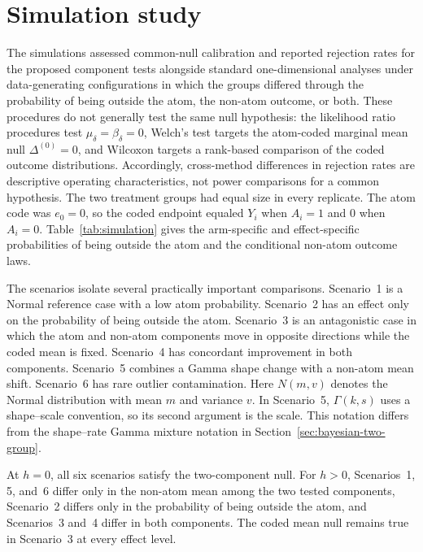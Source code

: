\documentclass[11pt]{article}
\begin{document}




\section{Simulation study}\label{sec:simulation-study}

The simulations assessed common-null calibration and reported rejection rates for the proposed component tests alongside standard one-dimensional analyses under data-generating configurations in which the groups differed through the probability of being outside the atom, the non-atom outcome, or both. These procedures do not generally test the same null hypothesis: the likelihood ratio procedures test $\mu_\delta=\beta_\delta=0$, Welch's test targets the atom-coded marginal mean null $\Delta^{(0)}=0$, and Wilcoxon targets a rank-based comparison of the coded outcome distributions. Accordingly, cross-method differences in rejection rates are descriptive operating characteristics, not power comparisons for a common hypothesis. The two treatment groups had equal size in every replicate. The atom code was $e_0=0$, so the coded endpoint equaled $Y_i$ when $A_i=1$ and 0 when $A_i=0$. Table~\ref{tab:simulation} gives the arm-specific and effect-specific probabilities of being outside the atom and the conditional non-atom outcome laws.

The scenarios isolate several practically important comparisons. Scenario~1 is a Normal reference case with a low atom probability. Scenario~2 has an effect only on the probability of being outside the atom. Scenario~3 is an antagonistic case in which the atom and non-atom components move in opposite directions while the coded mean is fixed. Scenario~4 has concordant improvement in both components. Scenario~5 combines a Gamma shape change with a non-atom mean shift. Scenario~6 has rare outlier contamination. Here $N(m,v)$ denotes the Normal distribution with mean $m$ and variance $v$. In Scenario~5, $\Gamma(k,s)$ uses a shape--scale convention, so its second argument is the scale. This notation differs from the shape--rate Gamma mixture notation in Section~\ref{sec:bayesian-two-group}.

At $h=0$, all six scenarios satisfy the two-component null. For $h>0$, Scenarios~1, 5, and~6 differ only in the non-atom mean among the two tested components, Scenario~2 differs only in the probability of being outside the atom, and Scenarios~3 and~4 differ in both components. The coded mean null remains true in Scenario~3 at every effect level.
\end{document}
